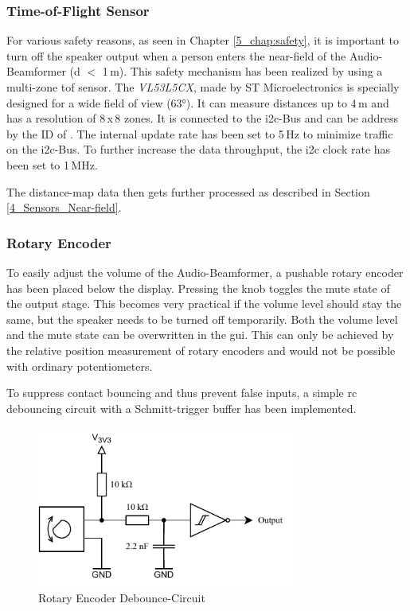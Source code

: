 \subsubsection{Time-of-Flight Sensor}
For various safety reasons, as seen in Chapter \ref{5_chap:safety}, it is important to turn off the speaker output when a person enters the near-field of the Audio-Beamformer (d $<$ 1\,m). This safety mechanism has been realized by using a multi-zone \acrfull{tof} sensor. The \textit{VL53L5CX}, made by ST Microelectronics is specially designed for a wide field of view (63°). It can measure distances up to 4\,m and has a resolution of 8\,x\,8 zones. It is connected to the \acrshort{i2c}-Bus and can be address by the ID of . The internal update rate has been set to 5\,Hz to minimize traffic on the \acrshort{i2c}-Bus. To further increase the data throughput, the \acrshort{i2c} clock rate has been set to 1\,MHz.

The distance-map data then gets further processed as described in Section \ref{4_Sensors_Near-field}.

\newpage
\subsubsection{Rotary Encoder}
To easily adjust the volume of the Audio-Beamformer, a pushable rotary encoder has been placed below the display. Pressing the knob toggles the mute state of the output stage. This becomes very practical if the volume level should stay the same, but the speaker needs to be turned off temporarily. Both the volume level and the mute state can be overwritten in the \acrshort{gui}. This can only be achieved by the relative position measurement of rotary encoders and would not be possible with ordinary potentiometers.

To suppress contact bouncing and thus prevent false inputs, a simple \acrshort{rc} debouncing circuit with a Schmitt-trigger buffer has been implemented.

\begin{figure}[h!]
	\centering
	\includegraphics[width=8.5cm]{images/4_Design/Hardware/Rotary Encoder Debounce.pdf}
	\vspace{-0.1cm}
    \caption{Rotary Encoder Debounce-Circuit}
    \label{fig:rotary_encoder-debounce_circuit}
\end{figure}

